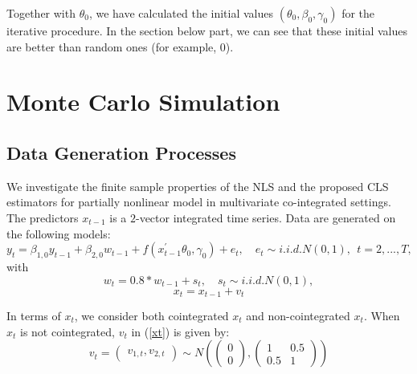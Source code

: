 \documentclass[a4paper,12pt,times,numbered,print,index]{report}
\numberwithin{equation}{section}
\begin{document}
Together with $\theta_0$, we have calculated the initial values $\left(\theta_{0}, \beta_{0}, \gamma_{0} \right) $ for the iterative procedure. In the section below part, we can see that these initial values are better than random ones (for example, 0).

\section{Monte Carlo Simulation}

\subsection{Data Generation Processes}
	
	We investigate the finite sample properties of the NLS and the proposed CLS estimators for partially nonlinear model in multivariate co-integrated settings. The predictors $x_{t-1}$ is a $2$-vector integrated time series. Data are generated on the following models:
	$$
	y_{t} = \beta_{1,0} y_{t-1} + \beta_{2,0} w_{t-1} + f\left( x_{t-1}^{\prime }\theta _{0},\gamma _{0}\right) +e_{t}, \quad
	e_{t}\sim i.i.d.N\left( 0,1\right) ,\ \ t=2,...,T,
	$$
	with
	$$
	w_{t} = 0.8*w_{t-1} + s_t, \quad
	s_{t}\sim i.i.d.N\left( 0,1\right),
	$$
	\begin{equation}
		x_t = x_{t-1} + v_t
		\label{xt}
	\end{equation}

	
	
	
	
	In terms of $x_t$, we consider both cointegrated $x_t$ and non-cointegrated $x_t$. When $x_t$ is not cointegrated, $v_t$ in (\ref{xt}) is given by:
	$$
	v_{t} =\left(\begin{array}{c}
	v_{1, t}, 
	v_{2, t}
	\end{array}\right) \sim N\left(\left(\begin{array}{c}
	0 \\
	0
	\end{array}\right),\left(\begin{array}{cc}
	1 & 0.5 \nonumber \\
	0.5 & 1
	\end{array}\right)\right)
	$$
	
\end{document}

